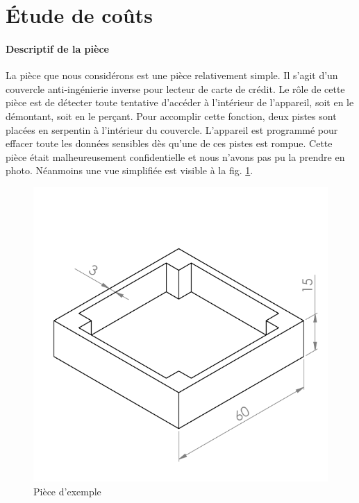 \section{Étude de coûts}


\paragraph{Descriptif de la pièce}
La pièce que nous considérons est une pièce relativement simple.
Il s'agit d'un couvercle anti-ingénierie inverse pour lecteur de carte de crédit.
Le rôle de cette pièce est de détecter toute tentative d'accéder à l'intérieur de l'appareil, soit en le démontant, soit en le perçant.
Pour accomplir cette fonction, deux pistes sont placées en serpentin à l'intérieur du couvercle.
L'appareil est programmé pour effacer toute les données sensibles dès qu'une de ces pistes est rompue.
Cette pièce était malheureusement confidentielle et nous n'avons pas pu la prendre en photo.
Néanmoins une vue simplifiée est visible à la fig. \ref{fig:example-part}.

\begin{figure}[h]
    \begin{center}
        \includegraphics[width=\textwidth]{images/example_part/example_mid}
        \caption{Pièce d'exemple}\label{fig:example-part}
    \end{center}
\end{figure}

